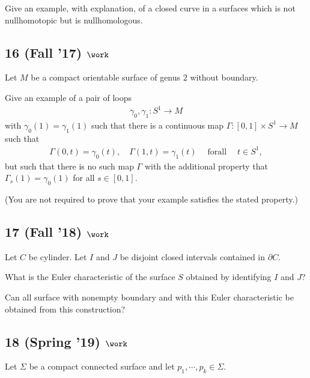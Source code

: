 Give an example, with explanation, of a closed curve in a surfaces which
is not nullhomotopic but is nullhomologous.

\hypertarget{fall-17-work-4}{%
\subsection{\texorpdfstring{16 (Fall '17)
\(\work\)}{16 (Fall '17) \textbackslash work}}\label{fall-17-work-4}}

Let \(M\) be a compact orientable surface of genus \(2\) without
boundary.

Give an example of a pair of loops
\begin{align*}\gamma_0 , \gamma_1 : S^1 \to M\end{align*}
with \(\gamma_0 (1) = \gamma_1 (1)\) such that there is a continuous map
\(\Gamma: [0, 1] \times S^1 \to M\) such that
\begin{align*}
\Gamma(0, t) = \gamma_0 (t), \quad \Gamma(1, t) = \gamma_1 (t) {\quad \operatorname{for all} \quad} t \in S^1
,\end{align*}
but such that there is no such map \(\Gamma\) with the additional
property that \(\Gamma_s (1) = \gamma_0 (1)\) for all \(s \in [0, 1]\).

(You are not required to prove that your example satisfies the stated
property.)

\hypertarget{fall-18-work-8}{%
\subsection{\texorpdfstring{17 (Fall '18)
\(\work\)}{17 (Fall '18) \textbackslash work}}\label{fall-18-work-8}}

Let \(C\) be cylinder. Let \(I\) and \(J\) be disjoint closed intervals
contained in \(\partial C\).

What is the Euler characteristic of the surface \(S\) obtained by
identifying \(I\) and \(J\)?

Can all surface with nonempty boundary and with this Euler
characteristic be obtained from this construction?

\hypertarget{spring-19-work-2}{%
\subsection{\texorpdfstring{18 (Spring '19)
\(\work\)}{18 (Spring '19) \textbackslash work}}\label{spring-19-work-2}}

Let \(\Sigma\) be a compact connected surface and let
\(p_1, \cdots , p_k \in \Sigma\).

